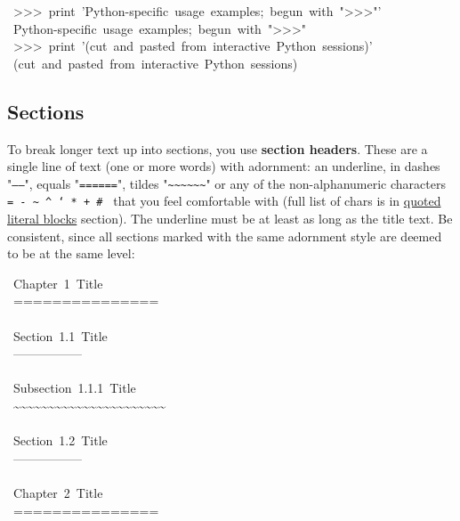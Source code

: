 \documentclass[12pt]{article}
\begin{document}
\begin{ttfamily}\begin{flushleft}
\mbox{~>>>~print~'Python-specific~usage~examples;~begun~with~">>>"'}\\
\mbox{~Python-specific~usage~examples;~begun~with~">>>"}\\
\mbox{~>>>~print~'(cut~and~pasted~from~interactive~Python~sessions)'}\\
\mbox{~(cut~and~pasted~from~interactive~Python~sessions)}\\
\end{flushleft}\end{ttfamily}

\hypertarget{lsections}{}
\subsection{Sections}

To break longer text up into sections, you use \textbf{section headers}. These are
a single line of text (one or more words) with adornment: an underline, in
dashes "\texttt{-----}", equals "\texttt{======}", tildes "\texttt{\~{}\~{}\~{}\~{}\~{}\~{}}" or any of the
non-alphanumeric characters \texttt{= - \~{} \^{} ` * + \# } that you feel comfortable
with (full list of chars is in \href{\#lquoted-literal-blocks}{quoted literal blocks} section). The
underline must be at least as long as the title text. Be consistent, since
all sections marked with the same adornment style are deemed to be at the same
level:

\begin{ttfamily}\begin{flushleft}
\mbox{~Chapter~1~Title}\\
\mbox{~===============}\\
\mbox{}\\
\mbox{~Section~1.1~Title}\\
\mbox{~-----------------}\\
\mbox{}\\
\mbox{~Subsection~1.1.1~Title}\\
\mbox{~\~{}\~{}\~{}\~{}\~{}\~{}\~{}\~{}\~{}\~{}\~{}\~{}\~{}\~{}\~{}\~{}\~{}\~{}\~{}\~{}\~{}\~{}}\\
\mbox{}\\
\mbox{~Section~1.2~Title}\\
\mbox{~-----------------}\\
\mbox{}\\
\mbox{~Chapter~2~Title}\\
\mbox{~===============}\\
\end{flushleft}\end{ttfamily}
\end{document}

